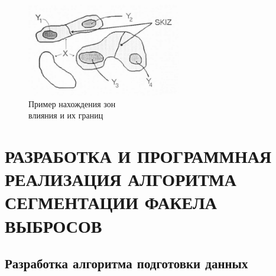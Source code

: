 \documentclass[14pt, a4paper]{extreport}
\begin{document}
	\begin{figure}[h!]
		\centering
		\includegraphics[width = 0.6\textwidth]{image/chapter_2/SKIZ}	
		\caption{Пример нахождения зон \\влияния и их границ}
		\label{fig:SKIZ}
	\end{figure}
	

\chapter[\vspace*{-0.22cm}РАЗРАБОТКА И ПРОГРАММНАЯ РЕАЛИЗАЦИЯ АЛГОРИТМА \hspace*{-0.5cm} СЕГМЕНТАЦИИ ФАКЕЛА ВЫБРОСОВ]{\vspace*{-0.22cm}РАЗРАБОТКА И ПРОГРАММНАЯ РЕАЛИЗАЦИЯ АЛГОРИТМА СЕГМЕНТАЦИИ ФАКЕЛА ВЫБРОСОВ}
\section[Разработка алгоритма подготовки данных]{Разработка алгоритма подготовки данных}
\end{document}
